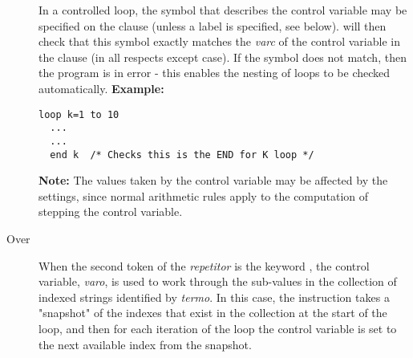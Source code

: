 \begin{description}
In a controlled loop, the symbol that describes the control variable may
be specified on the  clause (unless a label is specified,
see below).
\crexx{} will then check that this symbol exactly matches the
\emph{varc} of the control variable in the  clause (in
all respects except case).
If the symbol does not match, then the program is in error - this
enables the nesting of loops to be checked automatically.
 \textbf{Example:}
\begin{lstlisting}
loop k=1 to 10
  ...
  ...
  end k  /* Checks this is the END for K loop */
\end{lstlisting}
\textbf{Note: }The values taken by the control variable may be affected by the
 settings, since normal \crexx{} arithmetic rules apply
to the computation of stepping the control variable.
\item[Over]\label{refloopov}

When the second token of the \emph{repetitor} is the keyword
, the control variable, \emph{varo}, is used
to work through the sub-values in the collection of indexed strings
identified by \emph{termo}.
In this case, the  instruction takes a "snapshot" of
the indexes that exist in the collection at the start of the loop, and
then for each iteration of the loop the control variable is set to the
next available index from the snapshot.
 

\end{description}
